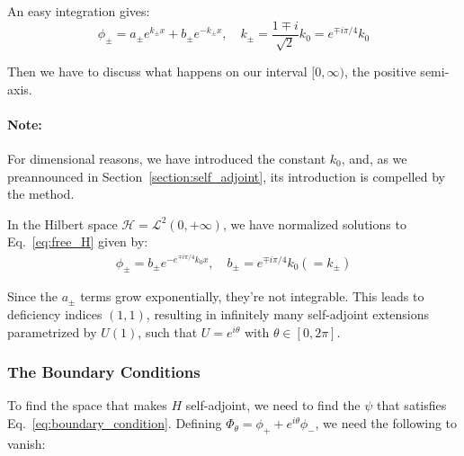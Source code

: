 \noindent
An easy integration gives:
\begin{equation*}
    \phi_{\pm} = a_{\pm}e^{k_{\pm}x} + b_{\pm}e^{-k_{\pm}x}, \quad k_{\pm} = \frac{1 \mp i}{\sqrt{2}} k_0 = e^{\mp i \pi/4} k_0
\end{equation*}

\noindent
Then we have to discuss what happens on our interval $[0,\infty)$, the positive semi-axis.
\paragraph{Note:}
For dimensional reasons, we have introduced the constant $k_0$, and, as we preannounced in Section~\ref{section:self_adjoint}, its introduction is compelled by the method.

\vspace{4mm}
\noindent
In the Hilbert space \(\mathcal{H} = \mathcal{L}^2(0, +\infty)\), we have normalized solutions to Eq.~\eqref{eq:free_H} given by:
\begin{align} \label{eq:freepart_eigenfun}
    \phi_{\pm} = b_{\pm}e^{-e^{\mp i \pi/4} k_0 x}, \quad b_\pm = e^{\mp i \pi /4} k_0 (= k_\pm)
\end{align}

\noindent
Since the $a_\pm$ terms grow exponentially, they're not integrable. This leads to deficiency indices \((1, 1)\), resulting in infinitely many self-adjoint extensions parametrized by \(U(1)\), such that $U = e^{i\theta}$ with $\theta \in [0,2\pi]$.
 
\clearpage

\subsubsection*{The Boundary Conditions}

To find the space that makes $H$ self-adjoint, we need to find the $\psi$ that satisfies Eq.~\eqref{eq:boundary_condition}. Defining $\Phi_\theta = \phi_+ + e^{i\theta} \phi_-$, we need the following to vanish:

